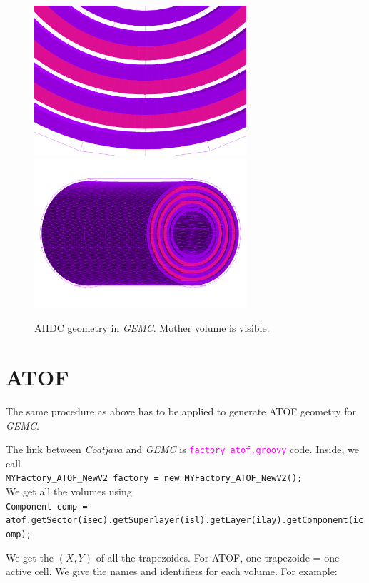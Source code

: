 \begin{figure}[H]
	\centering
	\includegraphics[width=0.7\textwidth]{gemc_ahdc_face_detail1.png}
	\includegraphics[width=0.7\textwidth]{gemc_ahdc_profile.png}
	\caption{AHDC geometry in \textit{GEMC}. Mother volume is visible.}
	\label{fig:ahdc_gemc}
\end{figure}


\newpage
\section{ATOF}
The same procedure as above has to be applied to generate ATOF geometry for \textit{GEMC}. 

The link between \textit{Coatjava} and \textit{GEMC} is \textcolor{magenta}{\texttt{factory\_atof.groovy}} code. Inside, we call \\ 
\texttt{MYFactory\_ATOF\_NewV2 factory = new MYFactory\_ATOF\_NewV2();} \\ 
We get all the volumes using \\
\texttt{Component comp = atof.getSector(isec).getSuperlayer(isl).getLayer(ilay).getComponent(icomp);}

We get the $(X,Y)$ of all the trapezoides. For ATOF, one trapezoide = one active cell. We give the names and identifiers for each volume. For example:

